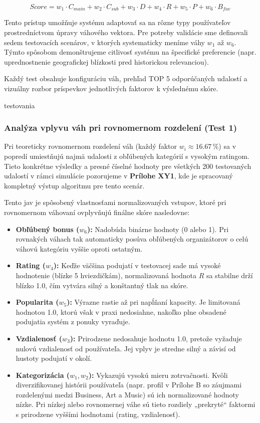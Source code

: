 \documentclass[12pt,a4paper]{article}
\begin{document}
\begin{equation}
Score = w_1 \cdot C_{main} + w_2 \cdot C_{sub} + w_3 \cdot D + w_4 \cdot R + w_5 \cdot P + w_6 \cdot B_{fav}
\label{eq:score_formula}
\end{equation}

Tento prístup umožňuje systému adaptovať sa na rôzne typy používateľov prostredníctvom úpravy váhového vektora. Pre potreby validácie sme definovali sedem testovacích scenárov, v ktorých systematicky meníme váhy $w_1$ až $w_6$. Týmto spôsobom demonštrujeme citlivosť systému na špecifické preferencie (napr. uprednostnenie geografickej blízkosti pred historickou relevanciou).

Každý test obsahuje konfiguráciu váh, prehľad TOP 5 odporúčaných udalostí a vizuálny rozbor príspevkov jednotlivých faktorov k výslednému skóre.


testovania 

\subsubsection{Analýza vplyvu váh pri rovnomernom rozdelení (Test 1)}

Pri teoreticky rovnomernom rozdelení váh (každý faktor $w_i \approx 16.67\,\%$) sa v popredí umiestňujú najmä udalosti z obľúbených kategórií s vysokým ratingom. Tieto konkrétne výsledky a presné číselné hodnoty pre všetkých 200 testovaných udalostí v rámci simulácie pozorujeme v \textbf{Prílohe XY1}, kde je spracovaný kompletný výstup algoritmu pre tento scenár.

Tento jav je spôsobený vlastnosťami normalizovaných vstupov, ktoré pri rovnomernom váhovaní ovplyvňujú finálne skóre nasledovne:

\begin{itemize}
    \item \textbf{Obľúbený bonus ($w_6$):} Nadobúda binárne hodnoty (0 alebo 1). Pri rovnakých váhach tak automaticky posúva obľúbených organizátorov o celú váhovú kategóriu vyššie oproti ostatným.
    \item \textbf{Rating ($w_4$):} Keďže väčšina podujatí v testovacej sade má vysoké hodnotenie (blízke 5 hviezdičkám), normalizovaná hodnota $R$ sa stabilne drží blízko 1.0, čím vytvára silný a konštantný tlak na skóre.
    \item \textbf{Popularita ($w_5$):} Výrazne rastie až pri napĺňaní kapacity. Je limitovaná hodnotou 1.0, ktorú však v praxi nedosiahne, nakoľko plne obsadené podujatia systém z ponuky vyraďuje.
    \item \textbf{Vzdialenosť ($w_3$):} Prirodzene nedosahuje hodnotu 1.0, pretože vyžaduje nulovú vzdialenosť od používateľa. Jej vplyv je stredne silný a závisí od hustoty podujatí v okolí.
    \item \textbf{Kategorizácia ($w_1, w_2$):} Vykazujú vysokú mieru zotrvačnosti. Kvôli diverzifikovanej histórii používateľa (napr. profil v Prílohe B so záujmami rozdelenými medzi Business, Art a Music) sú ich normalizované hodnoty nízke. Pri nízkej alebo rovnomernej váhe sú tieto rozdiely „prekryté“ faktormi s prirodzene vyššími hodnotami (rating, vzdialenosť).
\end{itemize}
\end{document}
